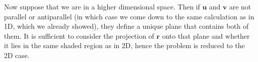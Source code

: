 Now suppose that we are in a higher dimensional space. Then if $\mathbf{u}$ and $\mathbf{v}$ are not parallel or antiparallel (in which case we come down to the same calculation as in 1D, which we already showed), they define a unique plane that contains both of them. It is sufficient to consider the projection of $\mathbf{r}$ onto that plane and whether it lies in the same shaded region as in 2D, hence the problem is reduced to the 2D case.

